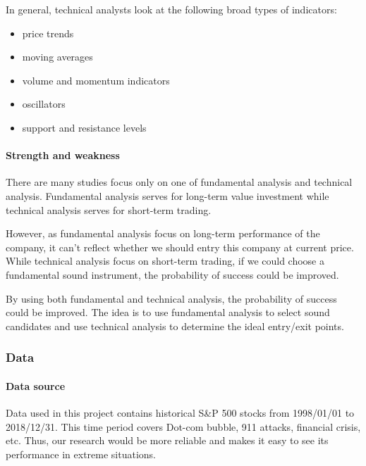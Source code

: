 \documentclass[]{article}
\providecommand{\tightlist}{%
  \setlength{\itemsep}{0pt}\setlength{\parskip}{0pt}}
\let\oldparagraph\paragraph
\renewcommand{\paragraph}[1]{\oldparagraph{#1}\mbox{}}
\begin{document}
In general, technical analysts look at the following broad types of
indicators:

\begin{itemize}
\tightlist
\item
  price trends
\item
  moving averages
\item
  volume and momentum indicators
\item
  oscillators
\item
  support and resistance levels
\end{itemize}

\hypertarget{strength-and-weakness}{%
\paragraph{Strength and weakness}\label{strength-and-weakness}}

There are many studies focus only on one of fundamental analysis and
technical analysis. Fundamental analysis serves for long-term value
investment while technical analysis serves for short-term trading.

However, as fundamental analysis focus on long-term performance of the
company, it can't reflect whether we should entry this company at
current price. While technical analysis focus on short-term trading, if
we could choose a fundamental sound instrument, the probability of
success could be improved.

By using both fundamental and technical analysis, the probability of
success could be improved. The idea is to use fundamental analysis to
select sound candidates and use technical analysis to determine the
ideal entry/exit points.

\hypertarget{data}{%
\subsubsection{Data}\label{data}}

\hypertarget{data-source}{%
\paragraph{Data source}\label{data-source}}

Data used in this project contains historical S\&P 500 stocks from
1998/01/01 to 2018/12/31. This time period covers Dot-com bubble, 911
attacks, financial crisis, etc. Thus, our research would be more
reliable and makes it easy to see its performance in extreme situations.
\end{document}
